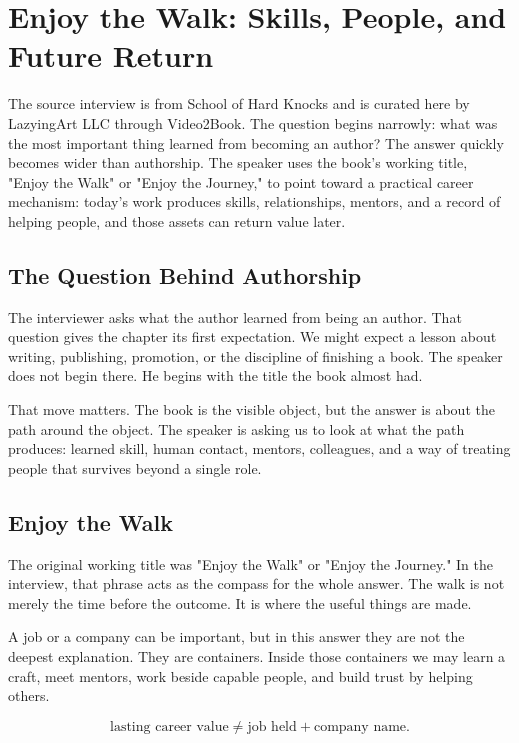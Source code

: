\chapter{Enjoy the Walk: Skills, People, and Future Return}

The source interview is from School of Hard Knocks and is curated here by LazyingArt LLC through Video2Book. The question begins narrowly: what was the most important thing learned from becoming an author? The answer quickly becomes wider than authorship. The speaker uses the book's working title, "Enjoy the Walk" or "Enjoy the Journey," to point toward a practical career mechanism: today's work produces skills, relationships, mentors, and a record of helping people, and those assets can return value later.

\section{The Question Behind Authorship}

The interviewer asks what the author learned from being an author. That question gives the chapter its first expectation. We might expect a lesson about writing, publishing, promotion, or the discipline of finishing a book. The speaker does not begin there. He begins with the title the book almost had.

That move matters. The book is the visible object, but the answer is about the path around the object. The speaker is asking us to look at what the path produces: learned skill, human contact, mentors, colleagues, and a way of treating people that survives beyond a single role.

\section{Enjoy the Walk}

The original working title was "Enjoy the Walk" or "Enjoy the Journey." In the interview, that phrase acts as the compass for the whole answer. The walk is not merely the time before the outcome. It is where the useful things are made.

A job or a company can be important, but in this answer they are not the deepest explanation. They are containers. Inside those containers we may learn a craft, meet mentors, work beside capable people, and build trust by helping others.

\begin{equation}
\text{lasting career value}
\neq
\text{job held}+\text{company name}.
\end{equation}

